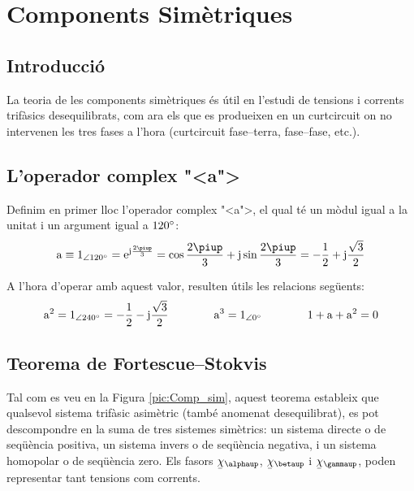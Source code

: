 \chapter{Components Sim\`{e}triques} 

\section{Introducci\'{o}}
La teoria de les components sim\`{e}triques \'{e}s \'{u}til en l'estudi de
tensions i corrents trif\`{a}sics
 desequilibrats, com ara els que es produeixen en un curtcircuit on no intervenen les tres
 fases a l'hora (curtcircuit fase--terra, fase--fase, etc.).

\section{L'operador complex {"<}a{">}}

Definim en primer lloc l'operador complex {"<}a{">}, el qual t\'{e} un m\`{o}dul
igual a la unitat i un argument igual a $120^\circ$: 
\begin{equation}
   \au \equiv \numpd{1}{120} = \eu^{\ju\frac{2\piup}{3}} =
   \cos \frac{2\piup}{3} + \ju \sin \frac{2\piup}{3} = - \frac{1}{2} + \ju \frac{\sqrt{3}}{2}
\end{equation}

A l'hora d'operar amb aquest valor, resulten \'{u}tils les relacions
seg\"{u}ents:
\begin{equation}
   \mathrm{a}^2 = \num{1}_{\angle\ang{240}}= - \frac{1}{2} - \mathrm{j} \frac{\sqrt{3}}{2}\qquad\qquad
   \mathrm{a}^3 = \num{1}_{\angle\ang{0}} \qquad\qquad
   1+ \mathrm{a} + \mathrm{a}^2 = 0
\end{equation}

\section{\texorpdfstring{Teorema de Fortescue--Stokvis}{Teorema de Fortescue-Stokvis}}

Tal com es veu en la Figura \vref{pic:Comp_sim}, aquest teorema
estableix que qualsevol sistema trif\`{a}sic asim\`{e}tric (tamb\'{e} anomenat
desequilibrat),  es pot descompondre  en la suma de tres sistemes
sim\`{e}trics: un sistema directe o de seq\"{u}\`{e}ncia positiva, un sistema
invers o de seq\"{u}\`{e}ncia negativa, i un sistema homopolar o de
seq\"{u}\`{e}ncia zero. Els fasors $\cmplx{\chi}_\alphaup$,
$\cmplx{\chi}_\betaup$ i $\cmplx{\chi}_\gammaup$, poden representar tant
tensions com corrents.

